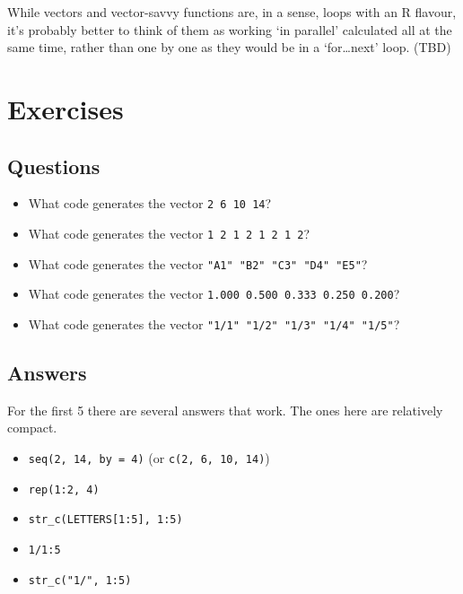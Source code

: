 \documentclass[
]{book}
\providecommand{\tightlist}{%
  \setlength{\itemsep}{0pt}\setlength{\parskip}{0pt}}
\begin{document}
While vectors and vector-savvy functions are, in a sense, loops with an R flavour, it's probably better to think of them as working `in parallel' calculated all at the same time, rather than one by one as they would be in a `for\ldots next' loop. (TBD)

\hypertarget{exercises-2}{%
\section{Exercises}\label{exercises-2}}

\hypertarget{questions-4}{%
\subsection{Questions}\label{questions-4}}

\begin{itemize}
\tightlist
\item
  What code generates the vector \texttt{2\ 6\ 10\ 14}?
\item
  What code generates the vector \texttt{1\ 2\ 1\ 2\ 1\ 2\ 1\ 2}?
\item
  What code generates the vector \texttt{"A1"\ "B2"\ "C3"\ "D4"\ "E5"}?
\item
  What code generates the vector \texttt{1.000\ 0.500\ 0.333\ 0.250\ 0.200}?
\item
  What code generates the vector \texttt{"1/1"\ "1/2"\ "1/3"\ "1/4"\ "1/5"}?
\end{itemize}

\hypertarget{answers-4}{%
\subsection{Answers}\label{answers-4}}

For the first 5 there are several answers that work. The ones here are relatively compact.

\begin{itemize}
\tightlist
\item
  \texttt{seq(2,\ 14,\ by\ =\ 4)} (or \texttt{c(2,\ 6,\ 10,\ 14)})
\item
  \texttt{rep(1:2,\ 4)}
\item
  \texttt{str\_c(LETTERS{[}1:5{]},\ 1:5)}
\item
  \texttt{1/1:5}
\item
  \texttt{str\_c("1/",\ 1:5)}
\end{itemize}

  
\end{document}
